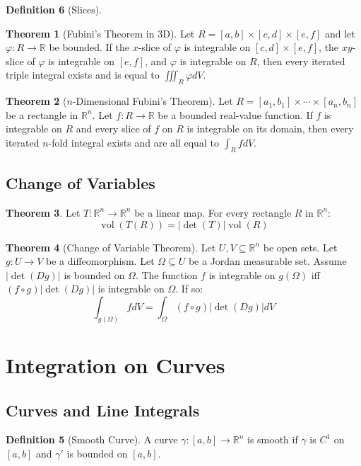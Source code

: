 \documentclass[12pt]{article}
\theoremstyle{definition}
\newtheorem{definition}{Definition}[subsection]
\newtheorem{theorem}[definition]{Theorem}
\theoremstyle{remark}
\begin{document}
\begin{definition}[Slices]
\begin{theorem}[Fubini's Theorem in 3D]
Let $R=[a,b]\times[c,d]\times[e,f]$ and let $\varphi:R\to\mathbb{R}$ be bounded. If the $x$-slice of $\varphi$ is integrable on $[c,d]\times[e,f]$, the $xy$-slice of $\varphi$ is integrable on $[e,f]$, and $\varphi$ is integrable on $R$, then every iterated triple integral exists and is equal to $\displaystyle\iiint_R\varphi dV$.
\end{theorem}

\begin{theorem}[$n$-Dimensional Fubini's Theorem]
Let $R=[a_1,b_1]\times\cdots\times[a_n,b_n]$ be a rectangle in $\mathbb{R}^n$. Let $f:R\to\mathbb{R}$ be a bounded real-value function. If $f$ is integrable on $R$ and every slice of $f$ on $R$ is integrable on its domain, then every iterated $n$-fold integral exists and are all equal to $\displaystyle\int_RfdV$.
\end{theorem}


\subsection{Change of Variables}
\begin{theorem}
Let $T:\mathbb{R}^n\to\mathbb{R}^n$ be a linear map. For every rectangle $R$ in $\mathbb{R}^n$:
\[
\operatorname{vol}(T(R))=|\det(T)|\operatorname{vol}(R)
\]
\end{theorem}

\begin{theorem}[Change of Variable Theorem]
Let $U,V\subseteq\mathbb{R}^n$ be open sets. Let $g:U\to V$ be a diffeomorphism. Let $\Omega\subseteq U$ be a Jordan measurable set. Assume $|\det(Dg)|$ is bounded on $\Omega$. The function $f$ is integrable on $g(\Omega)$ iff $(f\circ g)|\det(Dg)|$ is integrable on $\Omega$. If so:
\[
\int_{g(\Omega)}fdV=\int_{\Omega}(f\circ g)|\det(Dg)|dV
\]
\end{theorem}

\section{Integration on Curves}
\subsection{Curves and Line Integrals}
\begin{definition}[Smooth Curve]
A curve $\gamma:[a,b]\to\mathbb{R}^n$ is smooth if $\gamma$ is $C^1$ on $[a,b]$ and $\gamma'$ is bounded on $[a,b]$.
\end{definition}


\end{definition}
\end{document}
